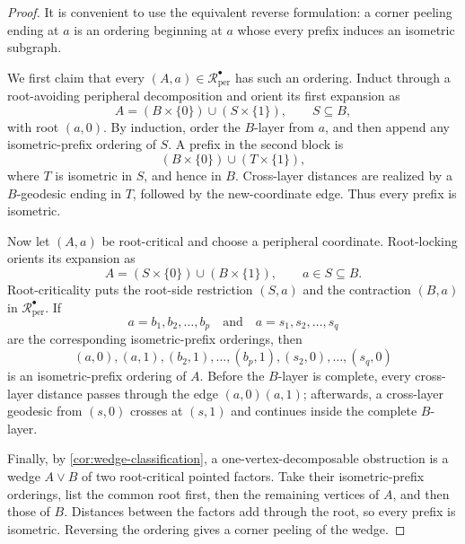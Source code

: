 \documentclass[11pt]{article}
\theoremstyle{definition}
\theoremstyle{remark}
\newcommand{\Rbullet}{\mathcal R_{\mathrm{per}}^{\bullet}}
\begin{document}
\begin{proof}
It is convenient to use the equivalent reverse formulation: a corner
peeling ending at \(a\) is an ordering beginning at \(a\) whose every prefix
induces an isometric subgraph.

We first claim that every \((A,a)\in\Rbullet\) has such an ordering.  Induct
through a root-avoiding peripheral decomposition and orient its first
expansion as
\[
 A=(B\times\{0\})\cup(S\times\{1\}),
 \qquad S\subseteq B,
\]
with root \((a,0)\).  By induction, order the \(B\)-layer from \(a\), and
then append any isometric-prefix ordering of \(S\).  A prefix in the second
block is
\[
 (B\times\{0\})\cup(T\times\{1\}),
\]
where \(T\) is isometric in \(S\), and hence in \(B\).  Cross-layer
distances are realized by a \(B\)-geodesic ending in \(T\), followed by the
new-coordinate edge.  Thus every prefix is isometric.

Now let \((A,a)\) be root-critical and choose a peripheral coordinate.
Root-locking orients its expansion as
\[
 A=(S\times\{0\})\cup(B\times\{1\}),
 \qquad a\in S\subseteq B.
\]
Root-criticality puts the root-side restriction \((S,a)\) and the
contraction \((B,a)\) in \(\Rbullet\).  If
\[
 a=b_1,b_2,\ldots,b_p
 \quad\text{and}\quad
 a=s_1,s_2,\ldots,s_q
\]
are the corresponding isometric-prefix orderings, then
\[
 (a,0),(a,1),(b_2,1),\ldots,(b_p,1),
 (s_2,0),\ldots,(s_q,0)
\]
is an isometric-prefix ordering of \(A\).  Before the \(B\)-layer is
complete, every cross-layer distance passes through the edge
\((a,0)(a,1)\); afterwards, a cross-layer geodesic from \((s,0)\) crosses at
\((s,1)\) and continues inside the complete \(B\)-layer.

Finally, by \cref{cor:wedge-classification}, a one-vertex-decomposable
obstruction is a wedge \(A\vee B\) of two root-critical pointed factors.
Take their isometric-prefix orderings, list the common root first, then the
remaining vertices of \(A\), and then those of \(B\).  Distances between
the factors add through the root, so every prefix is isometric.  Reversing
the ordering gives a corner peeling of the wedge.
\end{proof}
\end{document}
